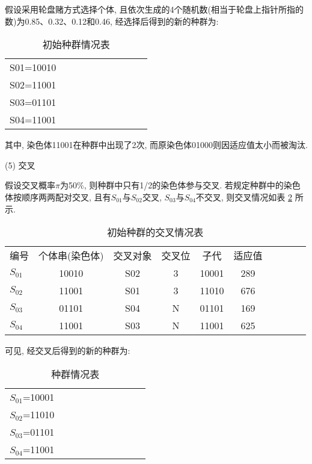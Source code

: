 假设采用轮盘赌方式选择个体, 且依次生成的4个随机数(相当于轮盘上指针所指的数)为0.85、0.32、0.12和0.46, 经选择后得到的新的种群为:
\begin{table} [H]
\caption{初始种群情况表}
\begin{center}
\begin{tabular} {lccccccccc}
\hline
    S01=10010\\
    S02=11001\\
    S03=01101\\
    S04=11001\\
\hline
\end{tabular}
\end{center}
\label{AI_table2019112803}
\end{table}
其中, 染色体11001在种群中出现了2次, 而原染色体01000则因适应值太小而被淘汰.

(5) 交叉

假设交叉概率$\pi$为50\%, 则种群中只有1/2的染色体参与交叉.
若规定种群中的染色体按顺序两两配对交叉, 且有$S_{01}$与$S_{02}$交叉, $S_{03}$与$S_{04}$不交叉, 则交叉情况如表 \ref{AI_table2019112804} 所示.

\begin{table} [H]
\caption{初始种群的交叉情况表}
\begin{center}
\begin{tabular} {lccccccccc}
  \hline
编号&	个体串(染色体)&	交叉对象	&交叉位&	  子代	& 适应值\\
$S_{01}$	&10010&	S02&	3	&10001	&289\\
$S_{02}$	&11001&	S01&	3	&11010	&676\\
$S_{03}$	&01101&	S04&	N	&01101	&169\\
$S_{04}$	&11001&	S03&	N	&11001	&625\\
\hline
\end{tabular}
\end{center}
\label{AI_table2019112804}
\end{table}

可见, 经交叉后得到的新的种群为:
\begin{table} [H]
\caption{种群情况表}
\begin{center}
\begin{tabular} {lccccccccc}
\hline
    $S_{01}$=10001\\
    $S_{02}$=11010\\
    $S_{03}$=01101\\
    $S_{04}$=11001\\
\hline
\end{tabular}
\end{center}
\end{table}

